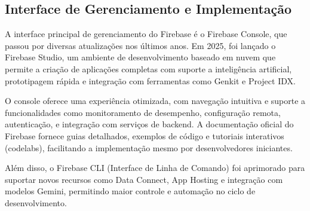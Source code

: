 \subsection{Interface de Gerenciamento e Implementação}

A interface principal de gerenciamento do Firebase é o Firebase Console, que passou por diversas atualizações nos últimos anos. Em 2025, foi lançado o Firebase Studio, um ambiente de desenvolvimento baseado em nuvem que permite a criação de aplicações completas com suporte a inteligência artificial, prototipagem rápida e integração com ferramentas como Genkit e Project IDX\cite{firebase2025releases}.

O console oferece uma experiência otimizada, com navegação intuitiva e suporte a funcionalidades como monitoramento de desempenho, configuração remota, autenticação, e integração com serviços de backend. A documentação oficial do Firebase fornece guias detalhados, exemplos de código e tutoriais interativos (codelabs), facilitando a implementação mesmo por desenvolvedores iniciantes.

Além disso, o Firebase CLI (Interface de Linha de Comando) foi aprimorado para suportar novos recursos como Data Connect, App Hosting e integração com modelos Gemini, permitindo maior controle e automação no ciclo de desenvolvimento.
\begin{comment}
	A operacionalização da plataforma Firebase é mediada por um console web especializado, denominado Firebase Console, que representa a interface principal de gerenciamento e configuração de projetos \cite{google2023console}. Este ambiente de desenvolvimento integrado foi projetado seguindo princípios de experiência do usuário (UX) orientados à simplicidade e intuitividade, proporcionando aos desenvolvedores um fluxo de trabalho otimizado para implementação de recursos.
	
	O processo de utilização inicia-se com a criação de um projeto no console, seguido pela seleção e configuração dos serviços desejados a partir de um catálogo extenso de funcionalidades disponíveis. Cada serviço oferecido pela plataforma é acompanhado de documentação técnica detalhada, incluindo guias de implementação passo-a-passo, exemplos de código e melhores práticas de desenvolvimento \cite{firebase2023implementation}.
	
	A evolução do Firebase reflete a estratégia da Google de oferecer uma solução integrada e escalável para desenvolvedores, permitindo a criação de aplicações robustas com menor complexidade técnica e maior foco na experiência do usuário.
\end{comment}

